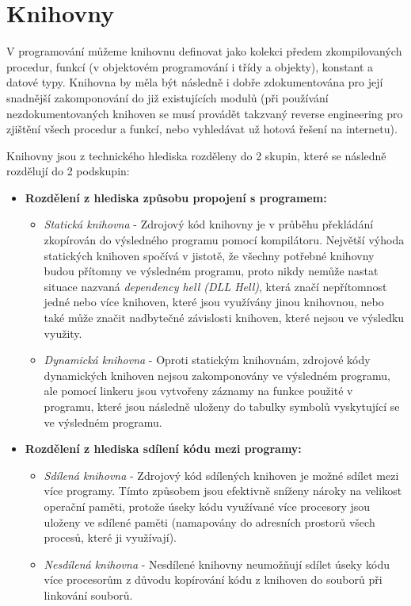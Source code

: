 \chapter{Knihovny}
V programování můžeme knihovnu definovat jako kolekci předem zkompilovaných procedur, funkcí (v objektovém programování i třídy a objekty), konstant a datové typy. Knihovna by měla být následně i dobře zdokumentována pro její snadnější zakomponování do již existujících modulů (při používání nezdokumentovaných knihoven se musí provádět takzvaný reverse engineering pro zjištění všech procedur a funkcí, nebo vyhledávat už hotová řešení na internetu). 
\par
Knihovny jsou z technického hlediska rozděleny do 2 skupin, které se následně rozdělují do 2 podskupin:
	\begin{itemize}
	\item \textbf{Rozdělení z hlediska způsobu propojení s programem:}
		\begin{itemize}
		\item \textit{Statická knihovna} - Zdrojový kód knihovny je v průběhu překládání zkopírován do výsledného programu pomocí kompilátoru. Největší výhoda statických knihoven spočívá v jistotě, že všechny potřebné knihovny budou přítomny ve výsledném programu, proto nikdy nemůže nastat situace nazvaná \textit{dependency hell (DLL Hell)}, která značí nepřítomnost jedné nebo více knihoven, které jsou využívány jinou knihovnou, nebo také může značit nadbytečné závislosti knihoven, které nejsou ve výsledku využity.
		\item \textit{Dynamická knihovna} - Oproti statickým knihovnám, zdrojové kódy dynamických knihoven nejsou zakomponovány ve výsledném programu, ale pomocí linkeru jsou vytvořeny záznamy na funkce použité v programu, které jsou následně uloženy do tabulky symbolů vyskytující se ve výsledném programu.
		\end{itemize}
	\item \textbf{Rozdělení z hlediska sdílení kódu mezi programy:}
		\begin{itemize}
		\item \textit{Sdílená knihovna} - Zdrojový kód sdílených knihoven je možné sdílet mezi více programy. Tímto způsobem jsou efektivně sníženy nároky na velikost operační paměti, protože úseky kódu využívané více procesory jsou uloženy ve sdílené paměti (namapovány do adresních prostorů všech procesů, které ji využívají).
		\item \textit{Nesdílená knihovna} - Nesdílené knihovny neumožňují sdílet úseky kódu více procesorům z důvodu kopírování kódu z knihoven do souborů při linkování souborů.
		\end{itemize}
	\end{itemize}
